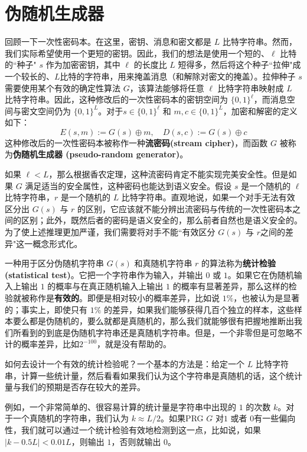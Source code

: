 \section{伪随机生成器}

回顾一下一次性密码本。在这里，密钥、消息和密文都是 $L$ 比特字符串。然而，我们实际希望使用一个更短的密钥。因此，我们的想法是使用一个短的、$\ell$ 比特的``种子" $s$ 作为加密密钥，其中 $\ell$ 的长度比 $L$ 短得多，然后将这个种子``拉伸"成一个较长的、$L$比特的字符串，用来掩盖消息（和解除对密文的掩盖）。拉伸种子 $s$ 需要使用某个有效的确定性算法 $G$，该算法能够将任意 $\ell$ 比特字符串映射成 $L$ 比特字符串。因此，这种修改后的一次性密码本的密钥空间为 $\{0,1\}^\ell$，而消息空间与密文空间仍为 $\{0,1\}^L$。对于$s\in\{0,1\}^\ell$ 和 $m,c\in\{0,1\}^L$，加密和解密的定义如下：
$$
E(s,m):=G(s)\oplus m,\quad
D(s,c):=G(s)\oplus c
$$
这种修改后的一次性密码本被称作一种\textbf{流密码(stream cipher)}，而函数 $G$ 被称为\textbf{伪随机生成器 (pseudo-random generator)}。

如果 $\ell<L$，那么根据香农定理，这种流密码肯定不能实现完美安全性。但是如果 $G$ 满足适当的安全属性，这种密码也能达到语义安全。假设 $s$ 是一个随机的 $\ell$ 比特字符串，$r$ 是一个随机的 $L$ 比特字符串。直观地说，如果一个对手无法有效区分出 $G(s)$ 与 $r$ 的区别，它应该就不能分辨出流密码与传统的一次性密码本之间的区别；此外，既然后者的密码是语义安全的，那么前者自然也是语义安全的。为了使上述推理更加严谨，我们需要将对手不能``有效区分 $G(s)$ 与 $r$之间的差异"这一概念形式化。

一种用于区分伪随机字符串 $G(s)$ 和真随机字符串 $r$ 的算法称为\textbf{统计检验(statistical test)}。它把一个字符串作为输入，并输出 $0$ 或 $1$。如果它在伪随机输入上输出 $1$ 的概率与在真正随机输入上输出 $1$ 的概率有显著差异，那么这样的检验就被称作是\textbf{有效的}。即便是相对较小的概率差异，比如说 $1\%$，也被认为是显著的；事实上，即使只有 $1\%$ 的差异，如果我们能够获得几百个独立的样本，这些样本要么都是伪随机的，要么就都是真随机的，那么我们就能够很有把握地推断出我们所看到的到底是伪随机字符串还是真随机字符串。但是，一个非零但是可忽略不计的概率差异，比如$2^{-100}$，就是没有帮助的。

如何去设计一个有效的统计检验呢？一个基本的方法是：给定一个 $L$ 比特字符串，计算一些统计量，然后看看如果我们认为这个字符串是真随机的话，这个统计量与我们的预期是否存在较大的差异。

例如，一个非常简单的、很容易计算的统计量是字符串中出现的 $1$ 的次数 $k$。对于一个真随机的字符串，我们认为 $k\approx{L}/{2}$。如果PRG $G$ 对$1$ 或者 $0$有一些偏向性，我们就可以通过一个统计检验有效地检测到这一点，比如说，如果 $|k-0.5L|<0.01L$，则输出 $1$，否则就输出 $0$。


